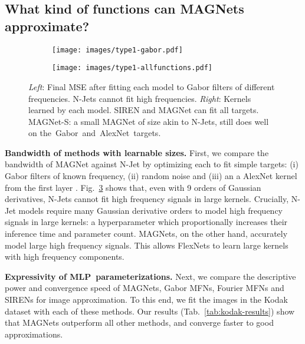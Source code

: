 \documentclass{article} \usepackage{iclr2022_conference,times}
\newcommand{\mlp}{{\btt MLP}}
\begin{document}
\subsection{What kind of functions can MAGNets approximate?}
\label{sec:type1-experiment}
\vspace{-2mm}
\begin{figure}
    \centering
     \begin{subfigure}[c]{0.49\textwidth}
         \centering
         \texttt{[image: images/type1-gabor.pdf]}
\label{fig:exp-type1-gabor-graph}
     \end{subfigure}
     \hfill
     \begin{subfigure}[c]{0.49\textwidth}
         \centering
         \vspace{-8mm}
\texttt{[image: images/type1-allfunctions.pdf]}
\label{fig:exp-type1-gabor-kernels}
     \end{subfigure}
     \hfill
    \vspace{-9mm}
    \caption{\textit{Left}: Final MSE after fitting each model to Gabor filters of different frequencies. N-Jets cannot fit high frequencies. \textit{Right}: Kernels learned by each model. SIREN and MAGNet can fit all targets. MAGNet-S: a small MAGNet of size akin to N-Jets, still does well on the~Gabor~and~AlexNet~targets.
    \vspace{-7mm}}
    \label{fig:exp-type1-gabor}
\end{figure}
\textbf{Bandwidth of methods with learnable sizes.} First, we compare the bandwidth of MAGNet against N-Jet \citep{pintea2021resolution} by optimizing each to fit simple targets: (i) Gabor filters of known frequency, (ii) random noise and (iii) an a  AlexNet kernel from the first layer \citep{krizhevsky_imagenet_2012}.\break
Fig.~\ref{fig:exp-type1-gabor} shows that, even with 9 orders of Gaussian derivatives, N-Jets cannot fit high frequency signals in large kernels. Crucially, N-Jet models require many Gaussian derivative orders to model high frequency signals in large kernels: a hyperparameter which proportionally increases their inference time and parameter count. MAGNets, on the other hand, accurately model large high frequency signals. This allows FlexNets to learn large kernels with high frequency components.

\textbf{Expressivity of \mlp\ parameterizations.} Next, we compare the descriptive power and convergence speed of MAGNets, Gabor MFNs, Fourier MFNs and SIRENs for image approximation. To this end, we fit the images in the Kodak dataset \citep{kodak1991} with each of these methods. Our results (Tab.~\ref{tab:kodak-results}) show that MAGNets outperform all other methods, and converge faster to good approximations.\vspace{-2mm}
\end{document}

